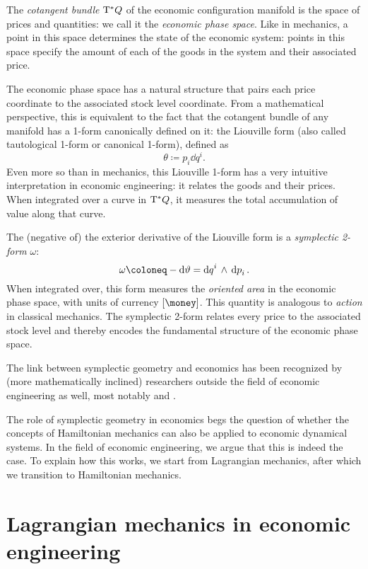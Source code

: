 The \emph{cotangent bundle} \(\mathrm{T}^*Q\) of the economic configuration manifold is the space of prices and quantities: we call it the \emph{economic phase space}. Like in mechanics, a point in this space determines the state of the economic system: points in this space specify the amount of each of the goods in the system and their associated price.

The economic phase space has a natural structure that pairs each price coordinate to the associated stock level coordinate. From a mathematical perspective, this is equivalent to the fact that the cotangent bundle of any manifold has a 1-form canonically defined on it: the Liouville form (also called tautological 1-form or canonical 1-form), defined as
\begin{equation} 
    \theta \coloneq  p_i \dd{q}^i.
\end{equation}
Even more so than in mechanics, this Liouville 1-form has a very intuitive interpretation in economic engineering: it relates the goods and their prices. When integrated over a curve in \(\mathrm{T}^*Q\), it measures the total accumulation of value along that curve.

The (negative of) the exterior derivative of the Liouville form is a \emph{symplectic 2-form} \(\omega\):
\begin{equation}
    \omega \coloneq -\dd{\theta} = \wedgep{\dd{q}^i}{\dd{p}_i}.
\end{equation}
When integrated over, this form measures the \emph{oriented area} in the economic phase space, with units of currency \([\si{\money}]\). This quantity is analogous to \emph{action} in classical mechanics. The symplectic 2-form relates every price to the associated stock level and thereby encodes the fundamental structure of the economic phase space.  

The link between symplectic geometry and economics has been recognized by (more mathematically inclined) researchers outside the field of economic engineering as well, most notably \citet{Russell2011} and \citet{Swierstra2014}.

The role of symplectic geometry in economics begs the question of whether the concepts of Hamiltonian mechanics can also be applied to economic dynamical systems. In the field of economic engineering, we argue that this is indeed the case. To explain how this works, we start from Lagrangian mechanics, after which we transition to Hamiltonian mechanics.

\section{Lagrangian mechanics in economic engineering}
\label{sec:lagrangian_ee}

